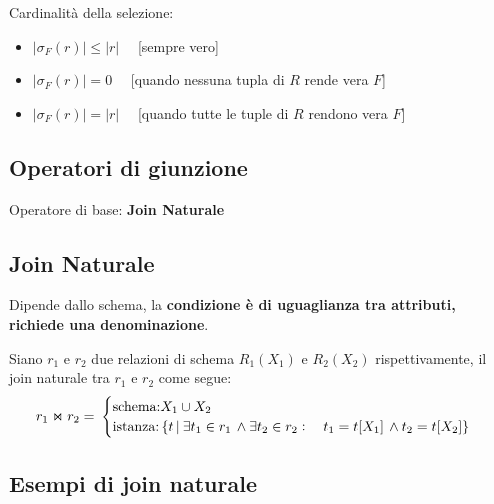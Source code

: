 \documentclass[a4paper, 10pt]{article}
\theoremstyle{definition}
\begin{document}
			Cardinalità della selezione:
			\begin{itemize}
				\item $| \sigma_F (r) | \leq |r| \quad$ [sempre vero]
				\item $| \sigma_F (r) | = 0 \quad$ [quando nessuna tupla di $R$ rende vera $F$]
				\item $| \sigma_F (r) | = |r| \quad$ [quando tutte le tuple di $R$ rendono vera $F$]
			\end{itemize}
			
		\newpage
		
	\subsection{Operatori di giunzione}
		Operatore di base: \textbf{Join Naturale}
		\subsection*{Join Naturale}
			Dipende dallo schema, la \textbf{condizione è di uguaglianza tra attributi, richiede una denominazione}.
			
			Siano $r_1$ e $r_2$ due relazioni di schema $R_1(X_1)$ e $R_2(X_2)$ rispettivamente, il join naturale tra $r_1$ e $r_2$ come segue:
			\[
				r_1 \Join r_2 = \:
				\begin{cases}
					\textup{schema:} X_1 \cup X_2 \\
					\textup{istanza:} \, \{ t\, | \: \exists t_1 \in r_1 \, \wedge \exists t_2 \in r_2 : \quad
						t_1 = t[X_1] \, \wedge t_2 = t [X_2]  \} 
				\end{cases}
			\]
		\subsection*{Esempi di join naturale}
			
\end{document}
